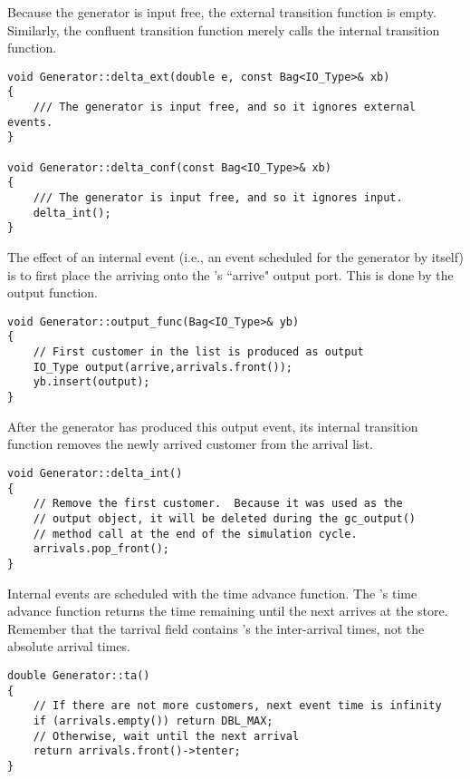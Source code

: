 Because the generator is input free, the external transition function
is empty. Similarly, the confluent transition function merely calls
the internal transition function. 
\begin{verbatim}
void Generator::delta_ext(double e, const Bag<IO_Type>& xb)
{
    /// The generator is input free, and so it ignores external events.
}

void Generator::delta_conf(const Bag<IO_Type>& xb)
{
    /// The generator is input free, and so it ignores input.
    delta_int();
}
\end{verbatim}

The effect of an internal event (i.e., an event scheduled for the
generator by itself) is to first place the arriving  onto the
's ``arrive" output port. This is done by the
output function.
\begin{verbatim}
void Generator::output_func(Bag<IO_Type>& yb)
{
    // First customer in the list is produced as output
    IO_Type output(arrive,arrivals.front());
    yb.insert(output);
}
\end{verbatim}
After the generator has produced this output event, its internal
transition function removes the newly arrived customer from the arrival list.
\begin{verbatim}
void Generator::delta_int()
{
    // Remove the first customer.  Because it was used as the
    // output object, it will be deleted during the gc_output()
    // method call at the end of the simulation cycle.
    arrivals.pop_front();
}
\end{verbatim}

Internal events are scheduled with the time advance function. The 's time advance function returns the time remaining until the next  arrives at the store. Remember that the tarrival field contains 's the inter-arrival times, not the absolute arrival times.
\begin{verbatim}
double Generator::ta()
{
    // If there are not more customers, next event time is infinity
    if (arrivals.empty()) return DBL_MAX;
    // Otherwise, wait until the next arrival
    return arrivals.front()->tenter;
}
\end{verbatim}

